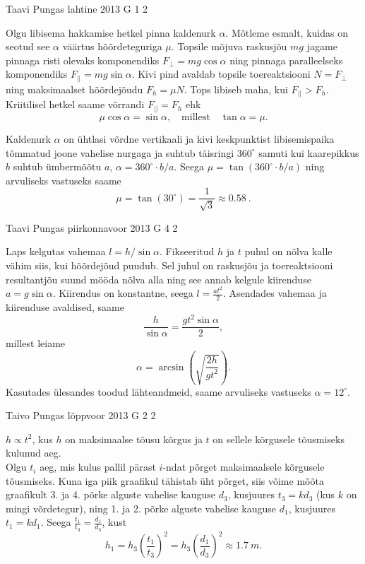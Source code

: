 \documentclass[11pt, twoside]{article}
\begin{document}
{%
{Taavi Pungas} %
{lahtine} %
{2013} %
{G 1} %
{2} %
{

\ifSolution
Olgu libisema hakkamise hetkel pinna kaldenurk $\alpha$. Mõtleme esmalt, kuidas on seotud see $\alpha$ väärtus hõõrdeteguriga $\mu$. Topsile mõjuva raskusjõu $mg$ jagame pinnaga risti olevaks komponendiks $F_{\bot}=mg\cos\alpha$ ning pinnaga paralleelseks komponendiks $F_{||}=mg\sin\alpha$. Kivi pind avaldab topsile toereaktsiooni $N=F_\bot$ ning maksimaalset hõõrdejõudu $F_h=\mu N$. Tops libiseb maha, kui $F_{||}>F_h$. Kriitilisel hetkel saame võrrandi $F_{||}=F_h$ ehk
\[ \mu \cos \alpha = \sin\alpha, \quad \text{millest} \quad \tan\alpha = \mu.\]

Kaldenurk $\alpha$ on ühtlasi võrdne vertikaali ja kivi keskpunktist libisemispaika tõmmatud joone vahelise nurgaga ja suhtub täisringi $360^\circ$ samuti kui kaarepikkus $b$ suhtub ümbermõõtu $a$, $\alpha = 360^\circ \!\cdot\! b/a$. Seega $\mu = \tan (360^\circ \! \cdot\! b/a)$ ning arvuliseks vastuseks saame 
\[\mu = \tan (30^\circ) = \frac{1}{\sqrt{3}} \approx \SI{0,58}{}.\]
\fi
}

{Taavi Pungas} %
{piirkonnavoor} %
{2013} %
{G 4} %
{2} %
{

\ifSolution
Laps kelgutas vahemaa $l=h / \sin \alpha$. Fikseeritud $h$ ja $t$ puhul on nõlva kalle vähim siis, kui hõõrdejõud puudub. Sel juhul on raskusjõu ja toereaktsiooni resultantjõu suund mööda nõlva alla ning see annab kelgule kiirenduse $a=g \sin \alpha$. Kiirendus on konstantne, seega $l=\frac{a t^2}{2}$. Asendades vahemaa ja kiirenduse avaldised, saame
\[
\frac{h}{\sin\alpha} = \frac{g t^2 \sin \alpha}{2},
\]
millest leiame
\[
\alpha = \arcsin\left( \sqrt{\frac{2h}{g t^2}}\right).
\]
Kasutades ülesandes toodud lähteandmeid, saame arvuliseks vastuseks $\alpha = 12^\circ$. 
\fi
}

{Taivo Pungas} %
{lõppvoor} %
{2013} %
{G 2} %
{2} %
{

\ifSolution
$h \propto t^{2}$, kus $h$ on maksimaalse tõusu kõrgus ja $t$ on sellele kõrgusele tõusmiseks kulunud aeg.\\
Olgu $t_{i}$ aeg, mis kulus pallil pärast $i$-ndat põrget maksimaalsele kõrgusele tõusmiseks. Kuna iga piik graafikul tähistab üht põrget, siis võime mõõta graafikult 3. ja 4. põrke alguste vahelise kauguse $d_{3}$, kusjuures $t_{3}=kd_{3}$ (kus $k$ on mingi võrdetegur), ning 1. ja 2. põrke alguste vahelise kauguse $d_{1}$, kusjuures $t_{1}=kd_{1}$. Seega 
$\frac{t_{1}}{t_{3}}=\frac{d_{1}}{d_{3}}$, kust
$$h_{1}=h_{3}\left(\frac{t_{1}}{t_{3}}\right)^{2}=h_{3}\left(\frac{d_{1}}{d_{3}}\right)^{2} \approx \SI{1,7}{m}.$$\\
\fi
}

}
\end{document}
